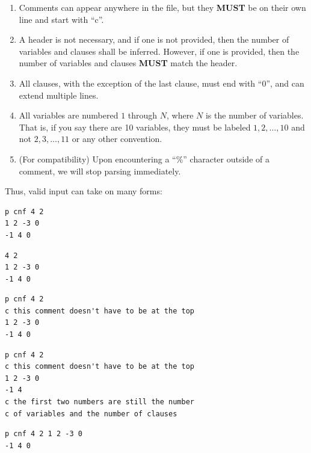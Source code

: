 \begin{enumerate}
    \item Comments can appear anywhere in the file, but they \textbf{MUST}
    be on their own line and start with ``c''.

    \item A header is not necessary, and if one is not provided, then the
    number of variables and clauses shall be inferred. However, if one is
    provided, then the number of variables and clauses \textbf{MUST} match the
    header.

    \item All clauses, with the exception of the last clause, must end with
    ``0'', and can extend multiple lines.

    \item All variables are numbered $1$ through $N$, where $N$ is the number
    of variables. That is, if you say there are 10 variables, they must be
    labeled $1,2,\ldots,10$ and not $2,3,\ldots,11$ or any other convention.

    \item (For compatibility) Upon encountering a ``\%'' character outside of
    a comment, we will stop parsing immediately.
\end{enumerate}

Thus, valid input can take on many forms:

\begin{lstlisting}
p cnf 4 2
1 2 -3 0
-1 4 0
\end{lstlisting}

\begin{lstlisting}
4 2
1 2 -3 0
-1 4 0
\end{lstlisting}

\begin{lstlisting}
p cnf 4 2
c this comment doesn't have to be at the top
1 2 -3 0
-1 4 0
\end{lstlisting}

\begin{center}
\begin{lstlisting}
p cnf 4 2
c this comment doesn't have to be at the top
1 2 -3 0
-1 4
c the first two numbers are still the number
c of variables and the number of clauses
\end{lstlisting}
\end{center}

\begin{lstlisting}
p cnf 4 2 1 2 -3 0
-1 4 0
\end{lstlisting}


